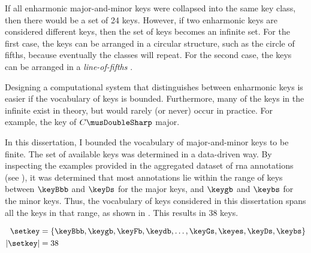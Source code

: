 
If all enharmonic major-and-minor keys were collapsed into
the same key class, then there would be a set of 24 keys.
However, if two enharmonic keys are considered different
keys, then the set of keys becomes an infinite set. For the
first case, the keys can be arranged in a circular
structure, such as the circle of fifths, because eventually
the classes will repeat. For the second case, the keys can
be arranged in a \emph{line-of-fifths}
\parencite{temperley2000line}.

Designing a computational system that distinguishes between
enharmonic keys is easier if the vocabulary of keys is
bounded. Furthermore, many of the keys in the infinite exist
in theory, but would rarely (or never) occur in practice.
For example, the key of $C\musDoubleSharp$ major.

In this dissertation, I bounded the vocabulary of
major-and-minor keys to be finite. The set of available keys
was determined in a data-driven way. By inspecting the
examples provided in the aggregated dataset of \gls{rna}
annotations (see ),
it was determined that most annotations lie within the range
of keys between $\keyBbb$ and $\keyDs$ for the major keys,
and $\keygb$ and $\keybs$ for the minor keys. Thus, the
vocabulary of keys considered in this dissertation spans all
the keys in that range, as shown in . This
results in 38 keys.

\begin{equation}
    \label{eq:keys}
    \begin{split}
    \setkey &= \{ \keyBbb, \keygb, \keyFb, \keydb, \dotsc,
    \keyGs, \keyes, \keyDs, \keybs \}\\
    | \setkey | &= 38
    \end{split}
\end{equation}
